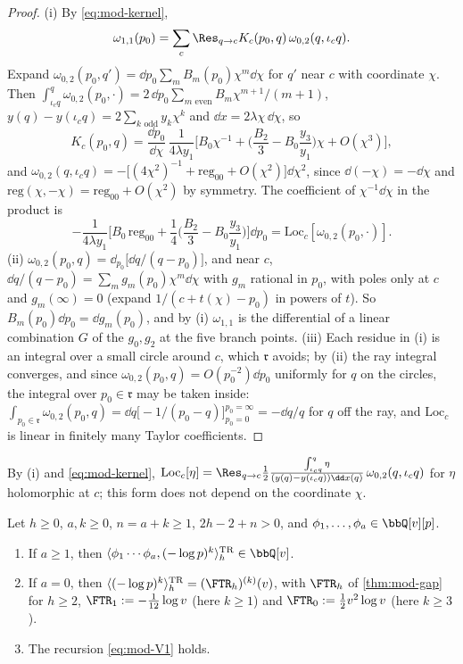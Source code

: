 \begin{proof}
(i) By \eqref{eq:mod-kernel},
\[
\omega_{1,1}(p_0)=\sum_c\Res_{q\to c}K_c(p_0,q)\,\omega_{0,2}(q,\iota_cq).
\]
Expand $\omega_{0,2}(p_0,q')=\dd p_0\sum_mB_m(p_0)\chi^m\dd\chi$ for $q'$ near $c$ with coordinate $\chi$. Then $\int_{\iota_cq}^q\omega_{0,2}(p_0,\cdot)=2\,\dd p_0\sum_{m\text{ even}}B_m\chi^{m+1}/(m+1)$, $y(q)-y(\iota_cq)=2\sum_{k\text{ odd}}y_k\chi^k$ and $\dd x=2\lambda\chi\,\dd\chi$, so
\[
K_c(p_0,q)=\frac{\dd p_0}{\dd\chi}\,\frac{1}{4\lambda y_1}\Big[B_0\chi^{-1}+\Big(\frac{B_2}{3}-B_0\frac{y_3}{y_1}\Big)\chi+O(\chi^3)\Big],
\]
and $\omega_{0,2}(q,\iota_cq)=-\big[(4\chi^2)^{-1}+\mathrm{reg}_{00}+O(\chi^2)\big]\dd\chi^2$, since $\dd(-\chi)=-\dd\chi$ and $\mathrm{reg}(\chi,-\chi)=\mathrm{reg}_{00}+O(\chi^2)$ by symmetry. The coefficient of $\chi^{-1}\dd\chi$ in the product is
\[
-\frac{1}{4\lambda y_1}\Big[B_0\,\mathrm{reg}_{00}+\frac14\Big(\frac{B_2}{3}-B_0\frac{y_3}{y_1}\Big)\Big]\dd p_0=\mathrm{Loc}_c[\omega_{0,2}(p_0,\cdot)].
\]
(ii) $\omega_{0,2}(p_0,q)=\dd_{p_0}\big[\dd q/(q-p_0)\big]$, and near $c$, $\dd q/(q-p_0)=\sum_mg_m(p_0)\chi^m\dd\chi$ with $g_m$ rational in $p_0$, with poles only at $c$ and $g_m(\infty)=0$ (expand $1/(c+t(\chi)-p_0)$ in powers of $t$). So $B_m(p_0)\dd p_0=\dd g_m(p_0)$, and by (i) $\omega_{1,1}$ is the differential of a linear combination $G$ of the $g_0,g_2$ at the five branch points. (iii) Each residue in (i) is an integral over a small circle around $c$, which $\mathfrak r$ avoids; by (ii) the ray integral converges, and since $\omega_{0,2}(p_0,q)=O(p_0^{-2})\dd p_0$ uniformly for $q$ on the circles, the integral over $p_0\in\mathfrak r$ may be taken inside: $\int_{p_0\in\mathfrak r}\omega_{0,2}(p_0,q)=\dd q\big[-1/(p_0-q)\big]_{p_0=0}^{p_0=\infty}=-\dd q/q$ for $q$ off the ray, and $\mathrm{Loc}_c$ is linear in finitely many Taylor coefficients.
\end{proof}

By (i) and \eqref{eq:mod-kernel}, $\mathrm{Loc}_c[\eta]=\Res_{q\to c}\frac12\frac{\int_{\iota_cq}^q\eta}{(y(q)-y(\iota_cq))\dd x(q)}\,\omega_{0,2}(q,\iota_cq)$ for $\eta$ holomorphic at $c$; this form does not depend on the coordinate $\chi$.

\begin{thm}[Theorem V]
\label{thm:mod-V}
Let $h\geq 0$, $a,k\geq 0$, $n=a+k\geq 1$, $2h-2+n>0$, and $\phi_1,\dots,\phi_a\in\bbQ[v][p]$.
\begin{enumerate}
\item If $a\geq 1$, then $\langle\phi_1\cdots\phi_a,(-\log p)^k\rangle^{\mathrm{TR}}_h\in\bbQ[v]$.
\item If $a=0$, then $\langle(-\log p)^k\rangle^{\mathrm{TR}}_h=(\FTR_h)^{(k)}(v)$, with $\FTR_h$ of \cref{thm:mod-gap} for $h\geq 2$, $\FTR_1:=-\frac1{12}\log v$ (here $k\geq 1$) and $\FTR_0:=\frac12v^2\log v$ (here $k\geq 3$).
\item The recursion \eqref{eq:mod-V1} holds.
\end{enumerate}
\end{thm}

